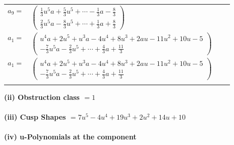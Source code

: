 \documentclass[1p]{elsarticle_modified}
\theoremstyle{definition}
\begin{document}
\begin{tabular}{m{7pt} m{180pt} m{7pt} m{180pt} }
\flushright $a_{9}=$&$\begin{pmatrix}\frac{1}{3} u^5 a+\frac{5}{3} u^5+\cdots-\frac{1}{3} a-\frac{8}{3}\\\frac{2}{3} u^5 a-\frac{8}{3} u^5+\cdots+\frac{1}{3} a+\frac{8}{3}\end{pmatrix}$ \\
\flushright $a_{1}=$&$\begin{pmatrix}u^4 a+2 u^5+u^3 a-4 u^4+8 u^3+2 a u-11 u^2+10 u-5\\-\frac{7}{3} u^5 a-\frac{2}{3} u^5+\cdots+\frac{4}{3} a+\frac{11}{3}\end{pmatrix}$\\ \flushright $a_{1}=$&$\begin{pmatrix}u^4 a+2 u^5+u^3 a-4 u^4+8 u^3+2 a u-11 u^2+10 u-5\\-\frac{7}{3} u^5 a-\frac{2}{3} u^5+\cdots+\frac{4}{3} a+\frac{11}{3}\end{pmatrix}$\\&\end{tabular}
\flushleft \textbf{(ii) Obstruction class $= 1$}\\~\\
\flushleft \textbf{(iii) Cusp Shapes $= 7 u^5-4 u^4+19 u^3+2 u^2+14 u+10$}\\~\\
\newpage\renewcommand{\arraystretch}{1}
\flushleft \textbf{(iv) u-Polynomials at the component}\newline \\
\end{document}
